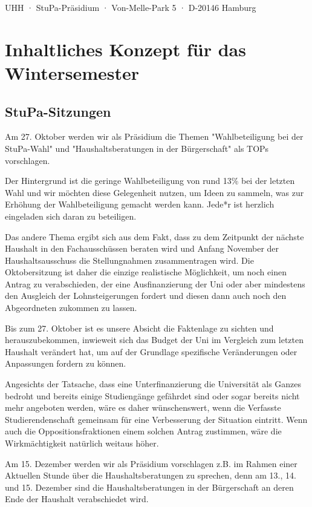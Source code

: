 \documentclass[ngerman,headheight=70pt]{scrartcl}
\begin{document}
    UHH · StuPa-Präsidium · Von-Melle-Park 5 · D-20146 Hamburg

    \section{Inhaltliches Konzept für das Wintersemester}

    \subsection{StuPa-Sitzungen}

    Am 27. Oktober werden wir als Präsidium die Themen "Wahlbeteiligung bei der
    StuPa-Wahl" und "Haushaltsberatungen in der Bürgerschaft" als TOPs vorschlagen.

    Der Hintergrund ist die geringe Wahlbeteiligung von rund 13\% bei der letzten
    Wahl und wir möchten diese Gelegenheit nutzen, um Ideen zu sammeln, was zur
    Erhöhung der Wahlbeteiligung gemacht werden kann. Jede*r ist herzlich eingeladen
    sich daran zu beteiligen.

    Das andere Thema ergibt sich aus dem Fakt, dass zu dem Zeitpunkt der nächste
    Haushalt in den Fachausschüssen beraten wird und Anfang November der
    Haushaltsausschuss die Stellungnahmen zusammentragen wird. Die Oktobersitzung
    ist daher die einzige realistische Möglichkeit, um noch einen Antrag zu
    verabschieden, der eine Ausfinanzierung der Uni oder aber mindestens den
    Ausgleich der Lohnsteigerungen fordert und diesen dann auch noch den
    Abgeordneten zukommen zu lassen.

    Bis zum 27. Oktober ist es unsere Absicht die Faktenlage zu sichten und
    herauszubekommen, inwieweit sich das Budget der Uni im Vergleich zum letzten
    Haushalt verändert hat, um auf der Grundlage spezifische Veränderungen oder
    Anpassungen fordern zu können.

    Angesichts der Tatsache, dass eine Unterfinanzierung die Universität als Ganzes
    bedroht und bereits einige Studiengänge gefährdet sind oder sogar bereits
    nicht mehr angeboten werden, wäre es daher wünschenswert, wenn die Verfasste
    Studierendenschaft gemeinsam für eine Verbesserung der Situation eintritt.
    Wenn auch die Oppositionsfraktionen einem solchen Antrag zustimmen, wäre
    die Wirkmächtigkeit natürlich weitaus höher.

    Am 15. Dezember werden wir als Präsidium vorschlagen z.B. im Rahmen einer
    Aktuellen Stunde über die Haushaltsberatungen zu sprechen, denn am 13., 14.
    und 15. Dezember sind die Haushaltsberatungen in der Bürgerschaft an deren
    Ende der Haushalt verabschiedet wird.
\end{document}
